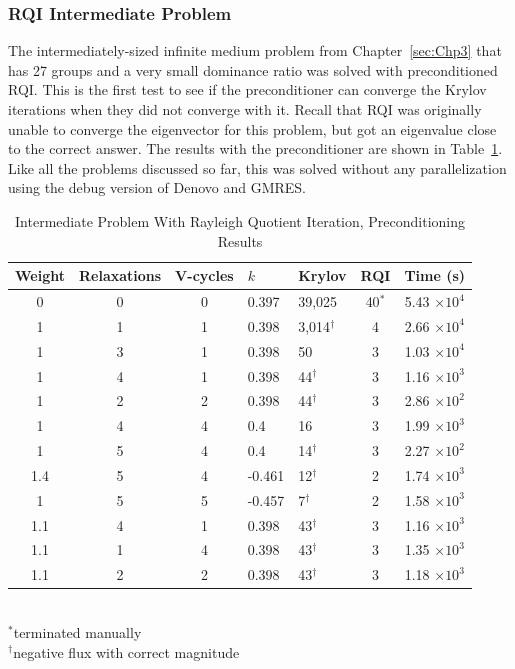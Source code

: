 \subsubsection{RQI Intermediate Problem}
The intermediately-sized infinite medium problem from Chapter~\ref{sec:Chp3} that has 27 groups and a very small dominance ratio was solved with preconditioned RQI. This is the first test to see if the preconditioner can converge the Krylov iterations when they did not converge with it. Recall that RQI was originally unable to converge the eigenvector for this problem, but got an eigenvalue close to the correct answer. The results with the preconditioner are shown in Table~\ref{table:impi RQI}. Like all the problems discussed so far, this was solved without any parallelization using the debug version of Denovo and GMRES. 
%
\begin{table}[!h]
\caption{Intermediate Problem With Rayleigh Quotient Iteration, Preconditioning Results}
\begin{center}
\begin{tabular}{c c c l l c c}
\hline
Weight & Relaxations & V-cycles & $k$ & Krylov & RQI & Time (s) \\[0.5ex]
\hline
0    & 0 & 0 & 0.397 & 39,025 & 40$^{*}$  & 5.43 $\times 10^{4}$ \\
1    & 1 & 1 & 0.398 & 3,014$^{\dagger}$ & 4 & 2.66 $\times 10^{4}$ \\
1    & 3 & 1 & 0.398 & 50                          & 3 & 1.03 $\times 10^{4}$ \\
1    & 4 & 1 & 0.398 & 44$^{\dagger}$      & 3 & 1.16 $\times 10^{3}$ \\
1    & 2 & 2 & 0.398 & 44$^{\dagger}$      & 3 & 2.86 $\times 10^{2}$ \\
1    & 4 & 4 & 0.4     & 16                          & 3 & 1.99 $\times 10^{3}$ \\
1    & 5 & 4 & 0.4     & 14$^{\dagger}$     & 3 & 2.27 $\times 10^{2}$ \\
1.4 & 5 & 4 & -0.461 & 12$^{\dagger}$    & 2 & 1.74 $\times 10^{3}$ \\
1    & 5 & 5 & -0.457 & 7$^{\dagger}$      & 2 & 1.58 $\times 10^{3}$ \\
\hline
1.1 & 4 & 1 & 0.398 & 43$^{\dagger}$      & 3 & 1.16 $\times 10^{3}$ \\
1.1 & 1 & 4 & 0.398 & 43$^{\dagger}$      & 3 & 1.35 $\times 10^{3}$ \\
1.1 & 2 & 2 & 0.398 & 43$^{\dagger}$      & 3 & 1.18 $\times 10^{3}$ \\
\hline 
\end{tabular}\\
$^{*}$terminated manually\\
$^{\dagger}$negative flux with correct magnitude
\end{center}
\label{table:impi RQI}
\end{table}

